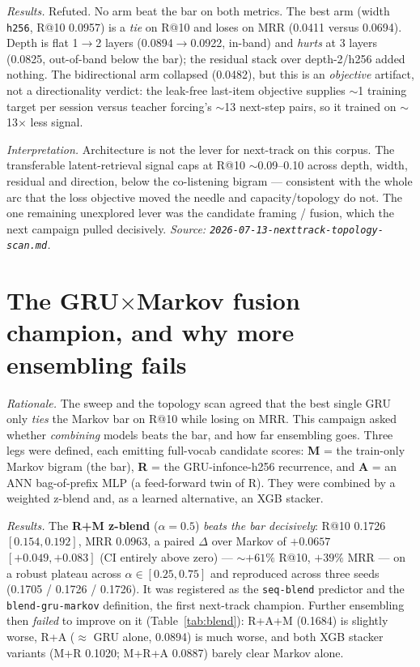 \documentclass[11pt]{article}
\begin{document}
\emph{Results.} Refuted. No arm beat the bar on both metrics. The best arm
(width \texttt{h256}, R@10 \num{0.0957}) is a \emph{tie} on R@10 and loses on
MRR (\num{0.0411} versus \num{0.0694}). Depth is flat 1$\to$2 layers
(\num{0.0894}$\to$\num{0.0922}, in-band) and \emph{hurts} at 3 layers
(\num{0.0825}, out-of-band below the bar); the residual stack over depth-2/h256
added nothing. The bidirectional arm collapsed (\num{0.0482}), but this is an
\emph{objective} artifact, not a directionality verdict: the leak-free last-item
objective supplies $\sim$1 training target per session versus teacher forcing's
$\sim$13 next-step pairs, so it trained on $\sim$13$\times$ less signal.

\emph{Interpretation.} Architecture is not the lever for next-track on this
corpus. The transferable latent-retrieval signal caps at R@10 $\sim$0.09--0.10
across depth, width, residual and direction, below the co-listening bigram ---
consistent with the whole arc that the loss objective moved the needle and
capacity/topology do not. The one remaining unexplored lever was the candidate
framing / fusion, which the next campaign pulled decisively.
\emph{Source: \texttt{2026-07-13-nexttrack-topology-scan.md}.}

\section{The GRU$\times$Markov fusion champion, and why more ensembling fails}
\label{sec:blend}
\emph{Rationale.} The sweep and the topology scan agreed that the best single
GRU only \emph{ties} the Markov bar on R@10 while losing on MRR. This campaign
asked whether \emph{combining} models beats the bar, and how far ensembling
goes. Three legs were defined, each emitting full-vocab candidate scores:
\textbf{M} = the train-only Markov bigram (the bar), \textbf{R} = the
GRU-infonce-h256 recurrence, and \textbf{A} = an ANN bag-of-prefix MLP (a
feed-forward twin of R). They were combined by a weighted z-blend and, as a
learned alternative, an XGB stacker.

\emph{Results.} The \textbf{R+M z-blend} ($\alpha{=}0.5$) \emph{beats the bar
decisively}: R@10 \num{0.1726} $[0.154, 0.192]$, MRR \num{0.0963}, a paired
$\Delta$ over Markov of $+\num{0.0657}$ $[+0.049, +0.083]$ (CI entirely above
zero) --- $\sim$$+61\%$ R@10, $+39\%$ MRR --- on a robust plateau across
$\alpha \in [0.25, 0.75]$ and reproduced across three seeds (\num{0.1705} /
\num{0.1726} / \num{0.1726}). It was registered as the \texttt{seq-blend}
predictor and the \texttt{blend-gru-markov} definition, the first next-track
champion. Further ensembling then \emph{failed} to improve on it
(Table~\ref{tab:blend}): R+A+M (\num{0.1684}) is slightly worse, R+A ($\approx$
GRU alone, \num{0.0894}) is much worse, and both XGB stacker variants (M+R
\num{0.1020}; M+R+A \num{0.0887}) barely clear Markov alone.
\end{document}
